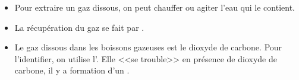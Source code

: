\begin{mybilan}
	\begin{itemize}
		\item Pour extraire un gaz dissous, on peut chauffer ou agiter l'eau qui le contient.
		\item La récupération du gaz se fait par . 
		
		\item Le gaz dissous dans les boissons gazeuses est le dioxyde de carbone. Pour l'identifier, on utilise l'. Elle <<se trouble>> en présence de dioxyde de carbone, il y a formation d'un .
	\end{itemize}

\end{mybilan}

